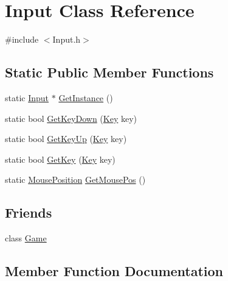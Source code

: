 \hypertarget{class_input}{}\section{Input Class Reference}
\label{class_input}


{\ttfamily \#include $<$Input.\+h$>$}

\subsection*{Static Public Member Functions}
\begin{DoxyCompactItemize}
\item 
static \mbox{\hyperlink{class_input}{Input}} $\ast$ \mbox{\hyperlink{class_input_aff0a59bfb791181b0741d2d6d5538ff6}{Get\+Instance}} ()
\item 
static bool \mbox{\hyperlink{class_input_a5b29d282d8c937962865527fc886c862}{Get\+Key\+Down}} (\mbox{\hyperlink{_input_8h_ab3c7af4820830f9166ede9e5623c4e73}{Key}} key)
\item 
static bool \mbox{\hyperlink{class_input_a03ee6f16ccae40e4acf900f41e798c4a}{Get\+Key\+Up}} (\mbox{\hyperlink{_input_8h_ab3c7af4820830f9166ede9e5623c4e73}{Key}} key)
\item 
static bool \mbox{\hyperlink{class_input_a3e693a63675d0aa58cc0fe922dc0a8b2}{Get\+Key}} (\mbox{\hyperlink{_input_8h_ab3c7af4820830f9166ede9e5623c4e73}{Key}} key)
\item 
static \mbox{\hyperlink{struct_mouse_position}{Mouse\+Position}} \mbox{\hyperlink{class_input_a946fb755b072d22267097e7118c752c0}{Get\+Mouse\+Pos}} ()
\end{DoxyCompactItemize}
\subsection*{Friends}
\begin{DoxyCompactItemize}
\item 
class \mbox{\hyperlink{class_input_aa2fab026580d6f14280c2ffb8063a314}{Game}}
\end{DoxyCompactItemize}


\subsection{Member Function Documentation}
\mbox{\label{class_input_aff0a59bfb791181b0741d2d6d5538ff6}} 

